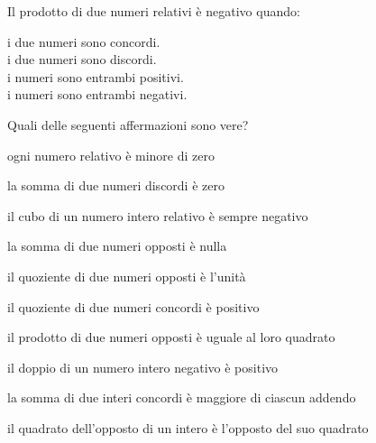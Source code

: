 \begin{esercizio}
Il prodotto di due numeri relativi è negativo quando:
 \begin{htmulticols}{2}
 \noindent
  \quad i due numeri sono concordi.\\
  \quad i due numeri sono discordi.\\
  \quad i numeri sono entrambi positivi.\\
  \quad i numeri sono entrambi negativi.
 \end{htmulticols}
\end{esercizio}

\pagebreak %

\begin{esercizio}
Quali delle seguenti affermazioni sono vere?
\TabPositions{110mm}
\begin{enumeratees}
 \item ogni numero relativo è minore di zero \tab\verofalso
 \item la somma di due numeri discordi è zero \tab\verofalso
 \item il cubo di un numero intero relativo è sempre negativo 
\tab\verofalso
 \item la somma di due numeri opposti è nulla \tab\verofalso
 \item il quoziente di due numeri opposti è l'unità \tab\verofalso
 \item il quoziente di due numeri concordi è positivo \tab\verofalso
 \item il prodotto di due numeri opposti è uguale al loro quadrato 
\tab\verofalso
 \item il doppio di un numero intero negativo è positivo \tab\verofalso
 \item la somma di due interi concordi è maggiore di ciascun addendo 
\tab\verofalso
 \item il quadrato dell'opposto di un intero è l'opposto del suo quadrato 
\tab\verofalso
\end{enumeratees}
\end{esercizio}

